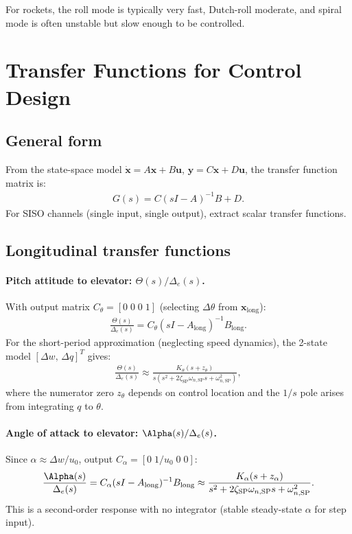 \documentclass[11pt]{article}
\begin{document}
For rockets, the roll mode is typically very fast, Dutch-roll moderate, and spiral mode is often unstable but slow enough to be controlled.

\section{Transfer Functions for Control Design}

\subsection{General form}
From the state-space model $\dot{\mathbf{x}}=A\mathbf{x}+B\mathbf{u}$, $\mathbf{y}=C\mathbf{x}+D\mathbf{u}$, the transfer function matrix is:
\begin{align}
G(s) = C(sI-A)^{-1}B + D.
\end{align}
For SISO channels (single input, single output), extract scalar transfer functions.

\subsection{Longitudinal transfer functions}

\paragraph{Pitch attitude to elevator: $\Theta(s)/\Delta_e(s)$.}
With output matrix $C_\theta=[0\;0\;0\;1]$ (selecting $\Delta\theta$ from $\mathbf{x}_{\text{long}}$):
\begin{align}
\frac{\Theta(s)}{\Delta_e(s)} = C_\theta(sI-A_{\text{long}})^{-1}B_{\text{long}}.
\end{align}
For the short-period approximation (neglecting speed dynamics), the 2-state model $[\Delta w,\,\Delta q]^T$ gives:
\begin{align}
\frac{\Theta(s)}{\Delta_e(s)} \approx \frac{K_\theta(s+z_\theta)}{s(s^2+2\zeta_{\text{SP}}\omega_{n,\text{SP}}s+\omega_{n,\text{SP}}^2)},
\end{align}
where the numerator zero $z_\theta$ depends on control location and the $1/s$ pole arises from integrating $q$ to $\theta$.

\paragraph{Angle of attack to elevator: $\Alpha(s)/\Delta_e(s)$.}
Since $\alpha\approx\Delta w/u_0$, output $C_\alpha=[0\;1/u_0\;0\;0]$:
\begin{align}
\frac{\Alpha(s)}{\Delta_e(s)} = C_\alpha(sI-A_{\text{long}})^{-1}B_{\text{long}}
\approx \frac{K_\alpha(s+z_\alpha)}{s^2+2\zeta_{\text{SP}}\omega_{n,\text{SP}}s+\omega_{n,\text{SP}}^2}.
\end{align}
This is a second-order response with no integrator (stable steady-state $\alpha$ for step input).
\end{document}
